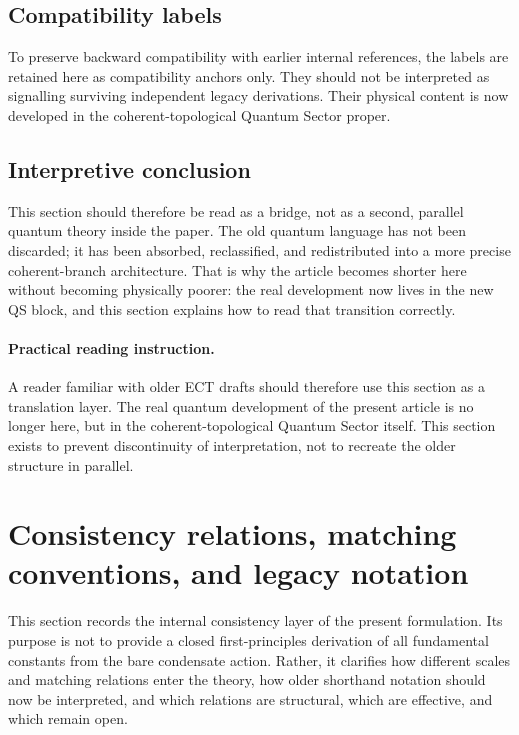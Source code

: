 \documentclass[11pt,a4paper]{article}
\numberwithin{equation}{section}
\begin{document}
\subsection*{Compatibility labels}

To preserve backward compatibility with earlier internal references,
the labels
\label{sec:loops}
\label{sec:CCR}
\label{par:real_vs_complex}
are retained here as compatibility anchors only.
They should not be interpreted as signalling surviving independent
legacy derivations.
Their physical content is now developed in the coherent-topological
Quantum Sector proper.

\subsection*{Interpretive conclusion}

This section should therefore be read as a bridge, not as a second,
parallel quantum theory inside the paper.
The old quantum language has not been discarded; it has been absorbed,
reclassified, and redistributed into a more precise coherent-branch
architecture.
That is why the article becomes shorter here without becoming
physically poorer: the real development now lives in the new QS block,
and this section explains how to read that transition correctly.

\paragraph{Practical reading instruction.}
A reader familiar with older ECT drafts should therefore use this
section as a translation layer.
The real quantum development of the present article is no longer here,
but in the coherent-topological Quantum Sector itself.
This section exists to prevent discontinuity of interpretation, not to
recreate the older structure in parallel.


\section{Consistency relations, matching conventions, and legacy notation}
\label{sec:consistency_relations}

This section records the internal consistency layer of the present
formulation.
Its purpose is not to provide a closed first-principles derivation of
all fundamental constants from the bare condensate action.
Rather, it clarifies how different scales and matching relations enter
the theory, how older shorthand notation should now be interpreted, and
which relations are structural, which are effective, and which remain
open.
\end{document}
